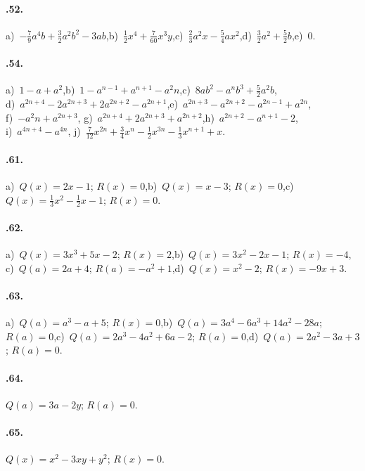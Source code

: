 \paragraph{\thechapter.52.} a)~$-\frac{7}{9}a^{4}b+\frac{3}{2}a^2b^2-3ab$,\quad b)~$\frac{1}{2}x^{4}+\frac{7}{60}x^{3}y$,\quad c)~$\frac{2}{3}a^{2}x-\frac{5}{4}ax^{2}$,\quad d)~$\frac{3}{2}a^{2}+\frac{5}{2}b$,\quad e)~$0$.
\paragraph{\thechapter.54.} a)~$1-a+a^{2}$,\quad b)~$1-a^{n-1}+a^{n+1}-a^{2}n$,\quad c)~$8ab^2-a^nb^3+\frac{5}{2}a^2b$, \protect\\
d)~$a^{2n+4}-2a^{2n+3}+2a^{2n+2}-a^{2n+1}$,\quad e)~$a^{2n+3}-a^{2n+2}-a^{2n-1}+a^{2n}$,\protect\\ f)~$-a^{2}n+a^{2n+3}$,\quad
g)~$a^{2n+4}+2a^{2n+3}+a^{2n+2}$,\quad h)~$a^{2n+2}-a^{n+1}-2$,\protect\\ i)~$a^{4n+4}-a^{4n}$,\quad
j)~$\frac{7}{12}x^{2n}+\frac{3}{4}x^{n}-\frac{1}{2}x^{3n}-\frac{1}{3}x^{n+1}+x$.
\paragraph{\thechapter.61.}
a)~$Q(x)=2x-1$; $R(x)=0$,\quad b)~$Q(x)=x-3$; $R(x)=0$,\quad c)~$Q(x)=\frac{1}{3}x^{2}-\frac{1}{2}x-1$; $R(x)=0$.
\paragraph{\thechapter.62.}
a)~$Q(x)=3x^{3}+5x-2$; $R(x)=2$,\quad b)~$Q(x)=3x^{2}-2x-1$; $R(x)=-4$,\protect\\ c)~$Q(a)=2a+4$; $R(a)=-a^{2}+1$,\quad d)~$Q(x)=x^{2}-2$; $R(x)=-9x+3$.
\paragraph{\thechapter.63.}
a)~$Q(a)=a^{3}-a+5$; $R(x)=0$,\quad b)~$Q(a)=3a^{4}-6a^{3}+14a^{2}-28a$; $R(a)=0$,\quad c)~$Q(a)=2a^{3}-4a^{2}+6a-2$; $R(a)=0$,\quad d)~$Q(a)=2a^{2}-3a+3$; $R(a)=0$.
\paragraph{\thechapter.64.}
$Q(a)=3a-2y$; $R(a)=0$.
\paragraph{\thechapter.65.}
$Q(x)=x^{2}-3xy+y^{2}$; $R(x)=0$.